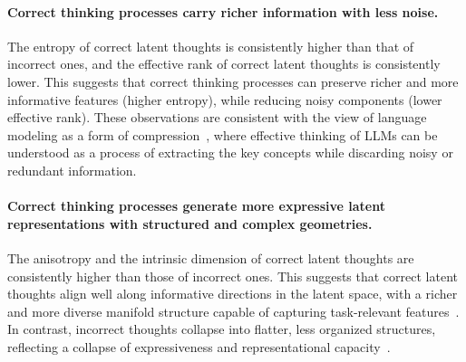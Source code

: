 \documentclass{article} %
\begin{document}
\paragraph*{Correct thinking processes carry richer information with less noise.}
%
The entropy of correct latent thoughts is consistently higher than that of incorrect ones, and the effective rank of correct latent thoughts is consistently lower. 
%
This suggests that correct thinking processes can preserve richer and more informative features (higher entropy), while reducing noisy components (lower effective rank). 
%
These observations are consistent with the view of language modeling as a form of compression~\citep{deletang2024language}, where effective thinking of LLMs can be understood as a process of extracting the key concepts while discarding noisy or redundant information.
%
\paragraph*{Correct thinking processes generate more expressive latent representations with structured and complex geometries.}
The anisotropy and the intrinsic dimension of correct latent thoughts are consistently higher than those of incorrect ones.
%
This suggests that correct latent thoughts align well along informative directions in the latent space, with a richer and more diverse manifold structure capable of capturing task-relevant features~\citep{valeriani2023geometry}.
%
In contrast, incorrect thoughts collapse into flatter, less organized structures, reflecting a collapse of expressiveness and representational capacity~\citep{ansuini2019intrinsic,cheng2025emergence}.
\end{document}
